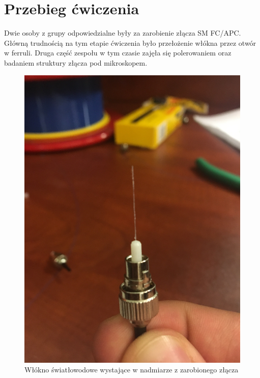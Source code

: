 \documentclass[12pt, a4paper, oneside]{article}
\begin{document}
\section{Przebieg ćwiczenia}
\indent\indent Dwie osoby z grupy odpowiedzialne były za zarobienie złącza SM FC/APC. Główną trudnością na tym etapie ćwiczenia było przełożenie włókna przez otwór w ferruli. Druga część zespołu w tym czasie zajęła się polerowaniem oraz badaniem struktury złącza pod mikroskopem.
\begin{figure}[h]
\centering
\caption{Włókno światłowodowe wystające w nadmiarze z zarobionego złącza}
\includegraphics[scale=0.1]{m3.jpg}
\end{figure}
\clearpage
\end{document}
